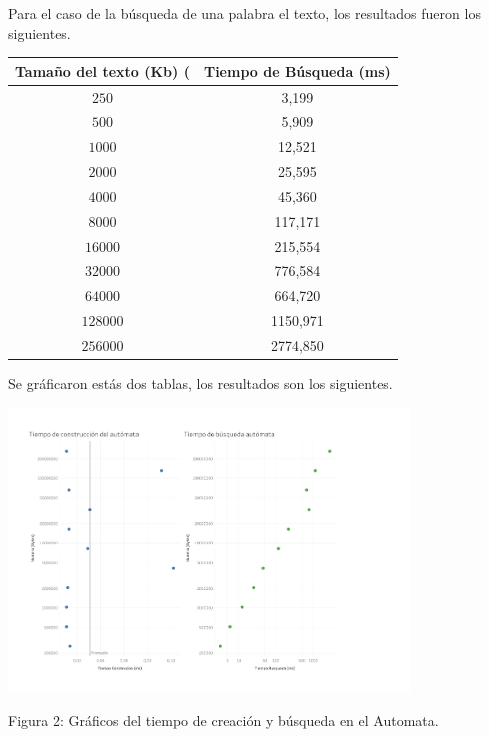 \documentclass[letterpaper,10pt]{article}
\begin{document}
	Para el caso de la búsqueda de una palabra el texto, los resultados fueron los siguientes.
	
	\begin{center}
		\begin{tabular}{|c|c|}
			\hline
			Tamaño del texto (Kb) ( & Tiempo de Búsqueda (ms)\\
			\hline
			$250$ & 3,199\\
			\hline
			$500$ & 5,909\\
			\hline
			$1000$ & 12,521\\
			\hline
			$2000$ & 25,595\\
			\hline
			$4000$ & 45,360\\
			\hline
			$8000$ & 117,171\\
			\hline
			$16000$ & 215,554\\
			\hline
			$32000$ & 776,584\\
			\hline
			$64000$ & 664,720\\
			\hline
			$128000$ & 1150,971\\
			\hline
			$256000$ & 2774,850\\
			\hline
		\end{tabular}
	\end{center}
	
	\newpage
    Se gráficaron estás dos tablas, los resultados son los siguientes.
	\begin{center}
		\includegraphics[width=0.8\textwidth]{figura2.pdf}

		Figura 2: Gráficos del tiempo de creación y búsqueda en el Automata.
	\end{center}
	\newpage
\end{document}
